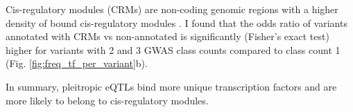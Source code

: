 Cis-regulatory modules (CRMs) are non-coding genomic regions with a higher density of bound cis-regulatory modules \cite{2021.Ballester.Hammal}.
%
I found that the odds ratio of variants annotated with CRMs vs non-annotated is significantly (Fisher's exact test) higher for variants with 2 and 3 GWAS class counts compared to class count 1 (Fig. \ref{fig:freq_tf_per_variant}b).

In summary, pleitropic eQTLs bind more unique transcription factors and are more
likely to belong to cis-regulatory modules.

%
%
%
